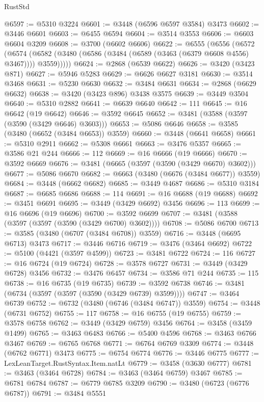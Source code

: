 \begin{lexlean}{RustStd}
\begin{coremodule}
{{{{{{{{{{{{{{{{{{{@6597 := @5310 @3224
@6601 := @3448 (@6596 @6597 @3584) @3473
@6602 := @3446 @6601
@6603 := @6455 @6594
@6604 := @3514 @3553
@6606 := @6603 @6604 @3209
@6608 := @3700 (@6602 @6606)
@6622 := @6555
    (@6556
      (@6572
        (@6574 (@6582 (@3480 (@6586 (@3484 (@6589 (@3463 (@6379 @6608 @4556) @3467)))) @3559)))))
@6624 := @2868 (@6539 @6622)
@6626 := @3420 (@3423 @871)
@6627 := @5946 @5283
@6629 := @6626 @6627 @3181
@6630 := @3514 @3468
@6631 := @5230 @6630
@6632 := @3484 @6631
@6634 := @2868 (@6629 @6632)
@6638 := @3420 (@3423 @896) @3438 @3575
@6639 := @3449 @3504
@6640 := @5310 @2882
@6641 := @6639 @6640
@6642 := 111
@6645 := @16 @6642 (@19 @6642)
@6646 := @3592 @6645
@6652 := @3481 (@3588 (@3597 (@3590 (@3429 @6646) @3603)))
@6653 := @5086 @6646
@6658 := @3585 (@3480 (@6652 (@3484 @6653)) @3559)
@6660 := @3448 (@6641 @6658)
@6661 := @5310 @2911
@6662 := @5308 @6661
@6663 := @3476 @5357
@6665 := @3586 @21 @244
@6666 := 112
@6669 := @16 @6666 (@19 @6666)
@6670 := @3592 @6669
@6676 := @3481 (@6665 (@3597 (@3590 (@3429 @6670) @3602)))
@6677 := @5086 @6670
@6682 := @6663 (@3480 (@6676 (@3484 @6677)) @3559)
@6684 := @3448 (@6662 @6682)
@6685 := @3449 @4687
@6686 := @5310 @3184
@6687 := @6685 @6686
@6688 := 114
@6691 := @16 @6688 (@19 @6688)
@6692 := @3451 @6691
@6695 := @3449 (@3429 @6692) @3456
@6696 := 113
@6699 := @16 @6696 (@19 @6696)
@6700 := @3592 @6699
@6707 := @3481 (@3588 (@3597 (@3597 (@3590 (@3429 @6700) @3602))))
@6708 := @5086 @6700
@6713 := @3585 (@3480 (@6707 (@3484 @6708)) @3559)
@6716 := @3448 (@6695 @6713) @3473
@6717 := @3446 @6716
@6719 := @3476 (@3464 @6692)
@6722 := @5100 (@4421 (@3597 @4599))
@6723 := @3481 @6722
@6724 := 116
@6727 := @16 @6724 (@19 @6724)
@6728 := @3578 @6727
@6731 := @3449 (@3429 @6728) @3456
@6732 := @3476 @6457
@6734 := @3586 @71 @244
@6735 := 115
@6738 := @16 @6735 (@19 @6735)
@6739 := @3592 @6738
@6746 := @3481 (@6734 (@3597 (@3597 (@3590 (@3429 @6739) @3599))))
@6747 := @3464 @6739
@6752 := @6732 (@3480 (@6746 (@3484 @6747)) @3559)
@6754 := @3448 (@6731 @6752)
@6755 := 117
@6758 := @16 @6755 (@19 @6755)
@6759 := @3578 @6758
@6762 := @3449 (@3429 @6759) @3456
@6764 := @3458 (@3459 @1499)
@6765 := @3463 @6483
@6766 := @5400 @4596
@6768 := @3463 @6766 @3467
@6769 := @6765 @6768
@6771 := @6764 @6769 @3309
@6774 := @3448 (@6762 @6771) @3473
@6775 := @6754 @6774
@6776 := @3446 @6775
@6777 := LexLeanTarget.RustSyntax.Item.natLt
@6779 := @3458 (@3630 @6777)
@6781 := @3463 (@3464 @6728)
@6784 := @3463 (@3464 @6759) @3467
@6785 := @6781 @6784
@6787 := @6779 @6785 @3209
@6790 := @3480 (@6723 (@6776 @6787))
@6791 := @3484 @5551
}}}}}}}}}}}}}}}}}}}
\end{coremodule}
\end{lexlean}
